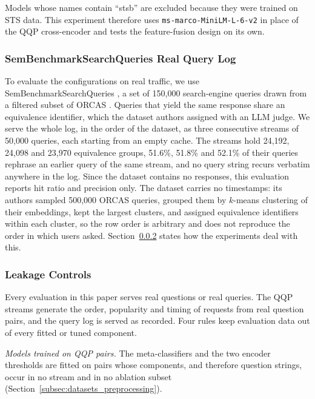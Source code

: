 \documentclass[authoryear,preprint,review,12pt]{elsarticle}
\begin{document}
Models whose names contain ``stsb'' are excluded because they were trained on STS data. This experiment therefore uses \texttt{ms-marco-MiniLM-L-6-v2} in place of the QQP cross-encoder and tests the feature-fusion design on its own.


\subsubsection{SemBenchmarkSearchQueries Real Query Log}
\label{subsubsec:searchqueries_data}
To evaluate the configurations on real traffic, we use SemBenchmarkSearchQueries \citep{schroeder2026vcache}, a set of 150,000 search-engine queries drawn from a filtered subset of ORCAS \citep{craswell2020orcas}. Queries that yield the same response share an equivalence identifier, which the dataset authors assigned with an LLM judge. We serve the whole log, in the order of the dataset, as three consecutive streams of 50,000 queries, each starting from an empty cache. The streams hold 24,192, 24,098 and 23,970 equivalence groups, 51.6\%, 51.8\% and 52.1\% of their queries rephrase an earlier query of the same stream, and no query string recurs verbatim anywhere in the log. Since the dataset contains no responses, this evaluation reports hit ratio and precision only. The dataset carries no timestamps: its authors sampled 500,000 ORCAS queries, grouped them by $k$-means clustering of their embeddings, kept the largest clusters, and assigned equivalence identifiers within each cluster, so the row order is arbitrary and does not reproduce the order in which users asked. Section~\ref{subsubsec:leakage_controls} states how the experiments deal with this.

\subsubsection{Leakage Controls}
\label{subsubsec:leakage_controls}
Every evaluation in this paper serves real questions or real queries. The QQP streams generate the order, popularity and timing of requests from real question pairs, and the query log is served as recorded. Four rules keep evaluation data out of every fitted or tuned component.

\textit{Models trained on QQP pairs.} The meta-classifiers and the two encoder thresholds are fitted on pairs whose components, and therefore question strings, occur in no stream and in no ablation subset (Section~\ref{subsec:datasets_preprocessing}).
\end{document}
